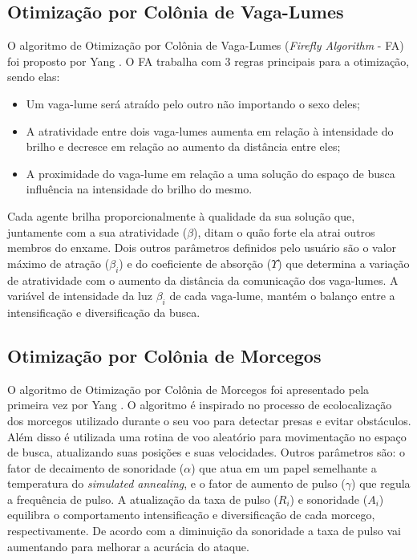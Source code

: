 \subsection{Otimização por Colônia de Vaga-Lumes}
\label{sec:firefly_algorithm}
O algoritmo de Otimização por Colônia de Vaga-Lumes (\textit{Firefly Algorithm} - FA) foi proposto por Yang \cite{firefly}. O FA trabalha com 3 regras principais para a otimização, sendo elas:

\begin{itemize}
\item Um vaga-lume será atraído pelo outro não importando o sexo deles;

\item A atratividade entre dois vaga-lumes aumenta em relação à intensidade do brilho e decresce em relação ao aumento da distância entre eles;

\item A proximidade do vaga-lume em relação a uma solução do espaço de busca influência na intensidade do brilho do mesmo.
\end{itemize}

Cada agente brilha proporcionalmente à qualidade da sua solução que, juntamente com a sua atratividade ($\beta$), ditam o quão forte ela atrai outros membros do enxame. Dois outros parâmetros definidos pelo usuário são o valor máximo de atração ($\beta_i$) e do coeficiente de absorção ($\Upsilon$) que determina a variação de atratividade com o aumento da distância da comunicação dos vaga-lumes. A variável
de intensidade da luz $\beta_i$ de cada vaga-lume, mantém o balanço entre a intensificação e diversificação da busca.

\subsection{Otimização por Colônia de Morcegos}
\label{sec:bat_algorithm}
O algoritmo de Otimização por Colônia de Morcegos foi apresentado pela primeira vez por Yang \cite{bat}. O algoritmo é inspirado no processo de ecolocalização dos morcegos utilizado durante o seu voo para detectar presas e evitar obstáculos. Além disso é utilizada uma rotina de voo aleatório para movimentação no espaço de busca, atualizando suas posições e suas velocidades. Outros parâmetros são: o fator de decaimento de sonoridade ($\alpha$) que atua em um papel semelhante a temperatura do \textit{simulated annealing}, e o fator de aumento de pulso ($\gamma$) que regula a frequência de pulso. A atualização da taxa de pulso ($R_i$) e sonoridade ($A_i$) equilibra o comportamento intensificação e diversificação de cada morcego, respectivamente. De acordo com a diminuição da sonoridade a taxa de pulso vai aumentando para melhorar a acurácia do ataque.

